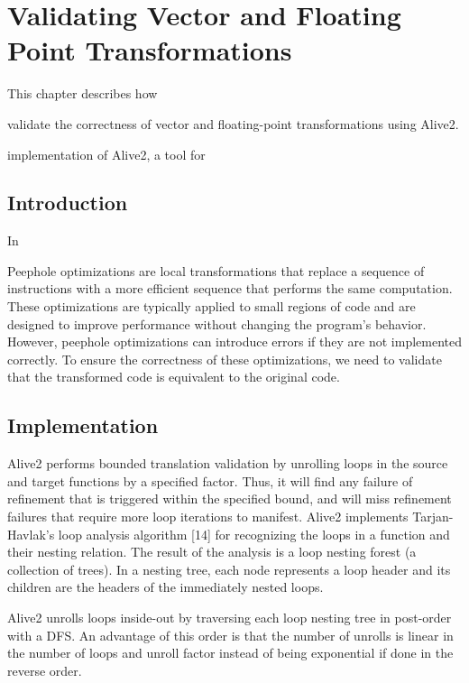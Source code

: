 \chapter{Validating Vector and Floating Point Transformations}
\label{chap:translation-validation}

This chapter describes how




 validate the correctness of vector and
floating-point transformations using Alive2.

 implementation of Alive2, a tool for


\section{Introduction}

In



Peephole optimizations are local transformations that replace a
sequence of instructions with a more efficient sequence that performs
the same computation.
%
These optimizations are typically applied to
small regions of code and are designed to improve performance without
changing the program's behavior. However, peephole optimizations can
introduce errors if they are not implemented correctly.
%
To ensure the
correctness of these optimizations, we need to validate that the
transformed code is equivalent to the original code.
%







\section {Implementation}

Alive2 performs bounded translation validation by unrolling loops in
the source and target functions by a specified factor. Thus, it will
find any failure of refinement that is triggered within the specified
bound, and will miss refinement failures that require more loop
iterations to manifest. Alive2 implements Tarjan-Havlak’s loop
analysis algorithm [14] for recognizing the loops in a function and
their nesting relation. The result of the analysis is a loop nesting
forest (a collection of trees). In a nesting tree, each node
represents a loop header and its children are the headers of the
immediately nested loops.

Alive2 unrolls loops inside-out by traversing each loop nesting tree
in post-order with a DFS. An advantage of this order is that the
number of unrolls is linear in the number of loops and unroll factor
instead of being exponential if done in the reverse order.


